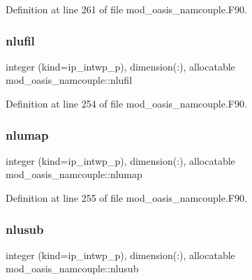 Definition at line 261 of file mod\+\_\+oasis\+\_\+namcouple.\+F90.

\mbox{\label{namespacemod__oasis__namcouple_a31f62f64cbcf344e529d0576386d0751}} 
\subsubsection{\texorpdfstring{nlufil}{nlufil}}
{\footnotesize\ttfamily integer (kind=ip\+\_\+intwp\+\_\+p), dimension(\+:), allocatable mod\+\_\+oasis\+\_\+namcouple\+::nlufil\hspace{0.3cm}{\ttfamily [private]}}



Definition at line 254 of file mod\+\_\+oasis\+\_\+namcouple.\+F90.

\mbox{\label{namespacemod__oasis__namcouple_a42367b4984c6ac4c69cbdcd315cb54e6}} 
\subsubsection{\texorpdfstring{nlumap}{nlumap}}
{\footnotesize\ttfamily integer (kind=ip\+\_\+intwp\+\_\+p), dimension(\+:), allocatable mod\+\_\+oasis\+\_\+namcouple\+::nlumap\hspace{0.3cm}{\ttfamily [private]}}



Definition at line 255 of file mod\+\_\+oasis\+\_\+namcouple.\+F90.

\mbox{\label{namespacemod__oasis__namcouple_aefed5eaa9924d249e979a5a772a46979}} 
\subsubsection{\texorpdfstring{nlusub}{nlusub}}
{\footnotesize\ttfamily integer (kind=ip\+\_\+intwp\+\_\+p), dimension(\+:), allocatable mod\+\_\+oasis\+\_\+namcouple\+::nlusub\hspace{0.3cm}{\ttfamily [private]}}



